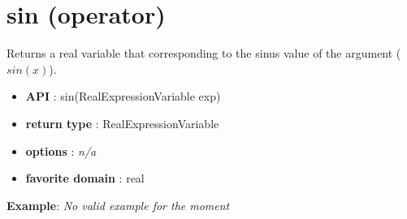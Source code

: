 \label{sin}
\hypertarget{sin}{}

\section{sin (operator)}\label{sin:sinoperator}\hypertarget{sin:sinoperator}{}
Returns a real variable that corresponding to the sinus value of the argument (\(sin(x)\)).

\begin{itemize}
	\item \textbf{API} : sin(RealExpressionVariable exp)
	\item \textbf{return type} : RealExpressionVariable
	\item \textbf{options} : \emph{n/a}
	\item \textbf{favorite domain} : real
\end{itemize}

\textbf{Example}:
%
\emph{No valid example for the moment}
